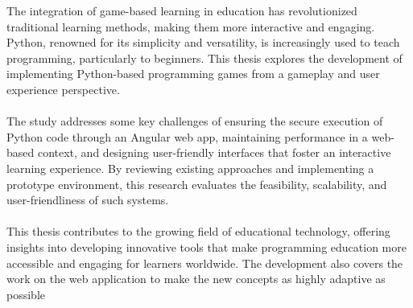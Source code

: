 The integration of game-based learning in education has revolutionized traditional learning methods, making them more interactive and engaging\cite{prensky2003digital}\cite{tobias2014game}. Python, renowned for its simplicity and versatility, is increasingly used to teach programming, particularly to beginners. This thesis explores the development of implementing Python-based programming games from a gameplay and user experience perspective.
\\\\
The study addresses some key challenges of ensuring the secure execution of Python code through an Angular web app, maintaining performance in a web-based context, and designing user-friendly interfaces that foster an interactive learning experience. By reviewing existing approaches and implementing a prototype environment, this research evaluates the feasibility, scalability, and user-friendliness of such systems.
\\\\
This thesis contributes to the growing field of educational technology, offering insights into developing innovative tools that make programming education more accessible and engaging for learners worldwide. The development also covers the work on the web application to make the new concepts as highly adaptive as possible
